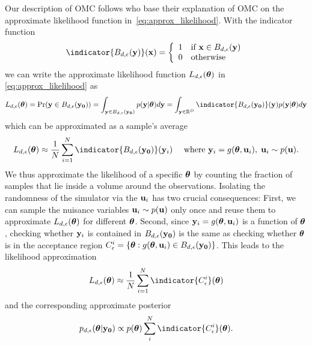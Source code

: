 Our description of OMC \citet{Meeds2015} follows \citet{Ikonomov2019}
who base their explanation of OMC on the approximate likelihood
function in~\eqref{eq:approx_likelihood}. With the indicator function
%
\begin{equation} \label{eq:indicator} \indicator{\region(\yb)}(\xb)=
  \left\{
    \begin{array}{ll}
      1 & \mbox{if } \xb \in \region(\yb) \\
      0 & \mbox{otherwise} 
    \end{array} \right. \end{equation}
%
we can write the approximate likelihood function \(L_{d, \epsilon}(\boldsymbol{\theta})\) in \eqref{eq:approx_likelihood} as
\begin{gather} \label{eq:approx_likelihood_omc}
  L_{d, \epsilon}(\thetab) = \Pr(\yb \in \region(\data)) =
  \int_{\yb \in B_{d,\epsilon}(\data)}p(\yb|\thetab)d\yb =
  \int_{\yb \in \R^D} \indicator{\region(\data)}(\yb)p(\yb|\thetab)d\yb
\end{gather}
which can be approximated as a sample's average
\begin{equation}
L_{d, \epsilon}(\thetab) \approx \frac{1}{N} \sum_{i=1}^N \indicator{\region (\data)} (\yb_i)
 \quad \text{ where } \yb_i = \simulator(\thetab, \ub_i),\; \ub_i \sim p(\ub). \label{eq:alt_view}
\end{equation}
We thus approximate the likelihood of a specific \(\boldsymbol{\theta}\) by
counting the fraction of samples that lie inside a volume around the
observations. Isolating the randomness of the simulator via the
\(\mathbf{u}_i\) has two crucial consequences: First, we can sample the
nuisance variables \(\mathbf{u}_i \sim p(\mathbf{u})\) only once and reuse them to
approximate \(L_{d,\epsilon}(\boldsymbol{\theta})\) for different
\(\boldsymbol{\theta}\). Second, since \(\mathbf{y}_i=g(\boldsymbol{\theta}, \mathbf{u}_i)\) is a
function of \(\boldsymbol{\theta}\), checking whether \(\mathbf{y}_i\) is contained in
\(B_{d,\epsilon} (\mathbf{y_0})\) is the same as checking whether \(\boldsymbol{\theta}\) is in
the acceptance region
\(C^i_{\epsilon} = \{ \boldsymbol{\theta}: g(\boldsymbol{\theta}, \mathbf{u}_i) \in
B_{d,\epsilon}(\mathbf{y_0}) \}\). This leads to the likelihood approximation
\begin{equation}
L_{d, \epsilon}(\thetab) \approx \frac{1}{N} \sum_{i=1}^N \indicator{\accregioni}(\thetab) \label{eq:alt_view_theta}
\end{equation}
and the corresponding approximate posterior
\begin{equation} \label{eq:approx_posterior_omc}
  p_{d,\epsilon}(\thetab|\data) \propto
  p(\thetab) \sum_i^N  \indicator{\accregioni}(\thetab).
\end{equation}
